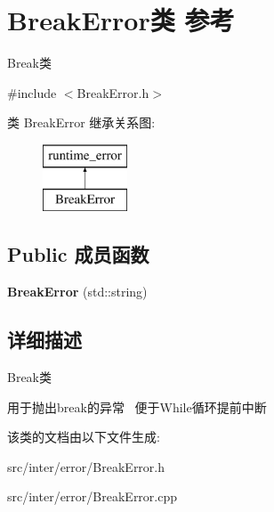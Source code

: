\hypertarget{class_break_error}{}\section{Break\+Error类 参考}
\label{class_break_error}


Break类  




{\ttfamily \#include $<$Break\+Error.\+h$>$}

类 Break\+Error 继承关系图\+:\begin{figure}[H]
\begin{center}
\leavevmode
\includegraphics[height=2.000000cm]{class_break_error}
\end{center}
\end{figure}
\subsection*{Public 成员函数}
\begin{DoxyCompactItemize}
\item 
{\bfseries Break\+Error} (std\+::string)\hypertarget{class_break_error_a94dc77c2e9e9088a44b073a9eda03833}{}\label{class_break_error_a94dc77c2e9e9088a44b073a9eda03833}

\end{DoxyCompactItemize}


\subsection{详细描述}
Break类 

用于抛出break的异常~\newline
便于\+While循环提前中断 

该类的文档由以下文件生成\+:\begin{DoxyCompactItemize}
\item 
src/inter/error/Break\+Error.\+h\item 
src/inter/error/Break\+Error.\+cpp\end{DoxyCompactItemize}
